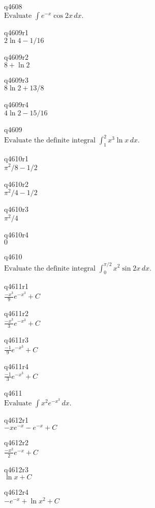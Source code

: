 q4608\\
\(\displaystyle \text{Evaluate } \int e^{-x} \cos 2x \, dx. \)

q4609r1\\
\(\displaystyle 2\ln4 - 1/16 \)

q4609r2\\
\(\displaystyle 8 + \ln 2 \)

q4609r3\\
\(\displaystyle 8 \ln 2 + 13/8 \)

q4609r4\\
\(\displaystyle 4 \ln 2 - 15/16 \)

q4609\\
\(\displaystyle \text{Evaluate the definite integral } \int_1^2 x^3 \ln x \, dx. \)

q4610r1\\
\(\displaystyle \pi^2/8 - 1/2 \)

q4610r2\\
\(\displaystyle \pi^2/4 - 1/2 \)

q4610r3\\
\(\displaystyle \pi^2/4 \)

q4610r4\\
\(\displaystyle 0 \)

q4610\\
\(\displaystyle \text{Evaluate the definite integral } \int_0^{\pi/2} x^2 \sin 2x\,dx. \)

q4611r1\\
\(\displaystyle \frac{-x^3}{9} e^{-x^3}+ C \)

q4611r2\\
\(\displaystyle \frac{-x^3}{3}e^{-x^3} + C \)

q4611r3\\
\(\displaystyle \frac{-1}{9} e^{-x^3} + C \)

q4611r4\\
\(\displaystyle \frac{-1}{3}e^{-x^3} + C \)

q4611\\
\(\displaystyle \text{Evaluate } \int x^2 e^{-x^3} \,dx. \)

q4612r1\\
\(\displaystyle -xe^{-x} -e^{-x} + C \)

q4612r2\\
\(\displaystyle \frac{-x^2}{2} e^{-x} + C \)

q4612r3\\
\(\displaystyle \ln x + C \)

q4612r4\\
\(\displaystyle -e^{-x} + \ln x^2 + C \)

